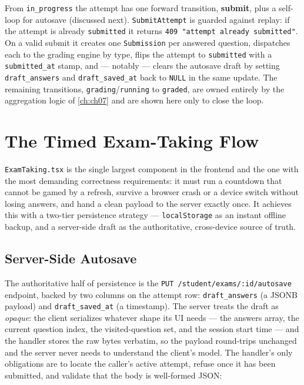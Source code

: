 From \texttt{in\_progress} the attempt has one forward transition, \textbf{submit},
plus a self-loop for autosave (discussed next). \texttt{SubmitAttempt} is
guarded against replay: if the attempt is already \texttt{submitted} it returns
\texttt{409 "attempt already submitted"}. On a valid submit it creates one
\texttt{Submission} per answered question, dispatches each to the grading
engine by type, flips the attempt to \texttt{submitted} with a
\texttt{submitted\_at} stamp, and --- notably --- clears the autosave draft by
setting \texttt{draft\_answers} and \texttt{draft\_saved\_at} back to
\texttt{NULL} in the same update. The remaining transitions,
\texttt{grading}/\texttt{running} to \texttt{graded}, are owned entirely by the
aggregation logic of \cref{ch:ch07} and are shown here only to close the loop.

\section{The Timed Exam-Taking Flow}

\texttt{ExamTaking.tsx} is the single largest component in the frontend and the
one with the most demanding correctness requirements: it must run a countdown
that cannot be gamed by a refresh, survive a browser crash or a device switch
without losing answers, and hand a clean payload to the server exactly once. It
achieves this with a two-tier persistence strategy --- \texttt{localStorage} as
an instant offline backup, and a server-side draft as the authoritative,
cross-device source of truth.

\subsection{Server-Side Autosave}

The authoritative half of persistence is the \texttt{PUT
/student/exams/:id/autosave} endpoint, backed by two columns on the attempt
row: \texttt{draft\_answers} (a JSONB payload) and \texttt{draft\_saved\_at} (a
timestamp). The server treats the draft as \emph{opaque}: the client serializes
whatever shape its UI needs --- the answers array, the current question index,
the visited-question set, and the session start time --- and the handler stores
the raw bytes verbatim, so the payload round-trips unchanged and the server
never needs to understand the client's model. The handler's only obligations
are to locate the caller's active attempt, refuse once it has been submitted,
and validate that the body is well-formed JSON:

